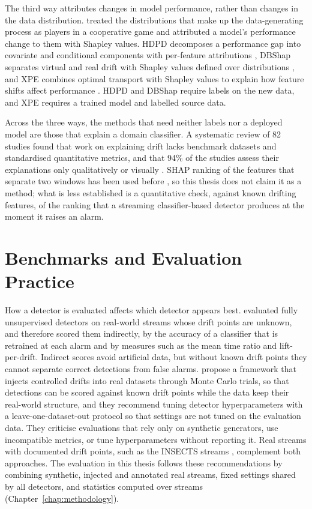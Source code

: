 The third way attributes changes in model performance, rather than changes in the data distribution. \citet{Zhang2023Attribution} treated the distributions that make up the data-generating process as players in a cooperative game and attributed a model's performance change to them with Shapley values. HDPD decomposes a performance gap into covariate and conditional components with per-feature attributions \citep{HDPD2024}, DBShap separates virtual and real drift with Shapley values defined over distributions \citep{DBShap2024}, and XPE combines optimal transport with Shapley values to explain how feature shifts affect performance \citep{XPE2024}. HDPD and DBShap require labels on the new data, and XPE requires a trained model and labelled source data.

Across the three ways, the methods that need neither labels nor a deployed model are those that explain a domain classifier. A systematic review of 82 studies found that work on explaining drift lacks benchmark datasets and standardised quantitative metrics, and that 94\% of the studies assess their explanations only qualitatively or visually \citep{XAIDriftSurvey2025}. SHAP ranking of the features that separate two windows has been used before \citep{Maggio2021}, so this thesis does not claim it as a method; what is less established is a quantitative check, against known drifting features, of the ranking that a streaming classifier-based detector produces at the moment it raises an alarm.

\section{Benchmarks and Evaluation Practice}
\label{sec:lit-evaluation}
How a detector is evaluated affects which detector appears best. \citet{Lukats2024} evaluated fully unsupervised detectors on real-world streams whose drift points are unknown, and therefore scored them indirectly, by the accuracy of a classifier that is retrained at each alarm and by measures such as the mean time ratio and lift-per-drift. Indirect scores avoid artificial data, but without known drift points they cannot separate correct detections from false alarms. \citet{CerqueiraKDD2026} propose a framework that injects controlled drifts into real datasets through Monte Carlo trials, so that detections can be scored against known drift points while the data keep their real-world structure, and they recommend tuning detector hyperparameters with a leave-one-dataset-out protocol so that settings are not tuned on the evaluation data. They criticise evaluations that rely only on synthetic generators, use incompatible metrics, or tune hyperparameters without reporting it. Real streams with documented drift points, such as the INSECTS streams \citep{Souza2020}, complement both approaches. The evaluation in this thesis follows these recommendations by combining synthetic, injected and annotated real streams, fixed settings shared by all detectors, and statistics computed over streams (Chapter~\ref{chap:methodology}).

